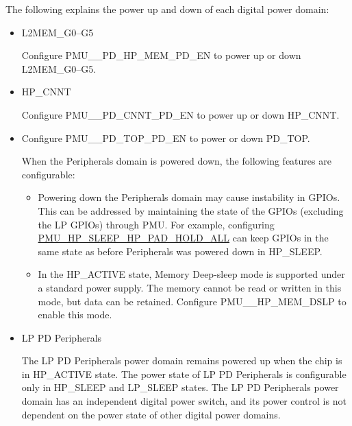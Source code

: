 \documentclass[main\_\_EN.tex]{subfiles}
\begin{document}
The following explains the power up and down of each digital power domain:

\begin{itemize}
\item L2MEM\_G0–G5

Configure PMU\_\_PD\_HP\_MEM\_PD\_EN to power up or down L2MEM\_G0–G5.

\item HP\_CNNT

Configure PMU\_\_PD\_CNNT\_PD\_EN to power up or down HP\_CNNT.


\item {}

Configure PMU\_\_PD\_TOP\_PD\_EN to power or down PD\_TOP.

When the Peripherals domain is powered down, the following features are configurable:

    \begin{itemize}
    \item Powering down the Peripherals domain may cause instability in GPIOs. This can be addressed by maintaining the state of the GPIOs (excluding the LP GPIOs) through PMU. For example, configuring \hyperref[fielddesc:PMUHPSLEEPHPPADHOLDALL]{PMU\_HP\_SLEEP\_HP\_PAD\_HOLD\_ALL} can keep GPIOs in the same state as before Peripherals was powered down in HP\_SLEEP.

    \item In the HP\_ACTIVE state, Memory Deep-sleep mode is supported under a standard power supply. The memory cannot be read or written in this mode, but data can be retained. Configure PMU\_\_HP\_MEM\_DSLP to enable this mode.
    \end{itemize}

\item LP PD Peripherals

The LP PD Peripherals power domain remains powered up when the chip is in HP\_ACTIVE state. The power state of LP PD Peripherals is configurable only in HP\_SLEEP and LP\_SLEEP states. The LP PD Peripherals power domain has an independent digital power switch, and its power control is not dependent on the power state of other digital power domains.

\end{itemize}
\end{document}
